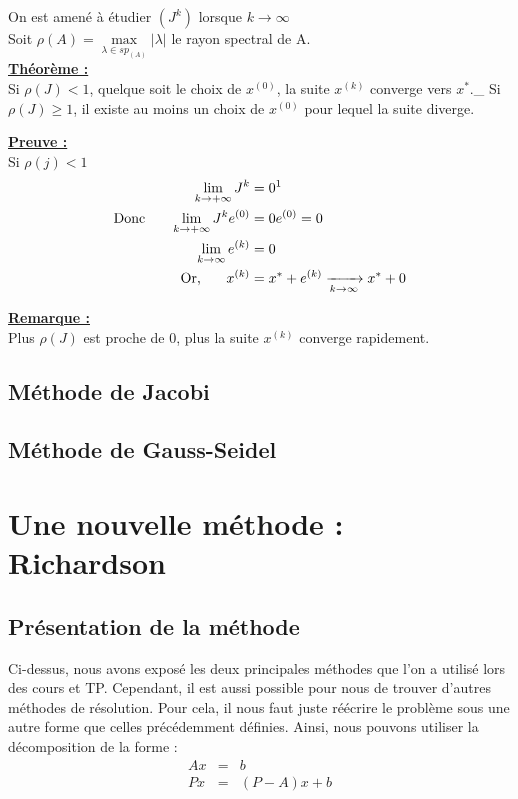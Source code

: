 On est amené à étudier $\left(J^k\right)$ lorsque $k \to \infty$\\

Soit $\rho(A) = \underset{\lambda \in sp_{(A)}}{\max}\left|\lambda\right|$ le rayon spectral de A.\\
\noindent\textbf{\underline{Théorème :}}\\
Si $\rho(J) < 1$, quelque soit le choix de $x^{(0)}$, la suite $x^{(k)}$ converge vers $x^*$.\_
Si $\rho(J) \geq 1$, il existe au moins un choix de $x^{(0)}$ pour lequel la suite diverge.

\noindent\textbf{\underline{Preuve :}}\\
Si $\rho(j) < 1$ \\
\begin{align*}
\lim\limits_{k \to +\infty} J^k &= 0 \text{\footnotemark}\\
\text{Donc } \hspace{15pt} \lim\limits_{k \to +\infty} J^ke^{(0)} &= 0e^{(0)} = 0\\
\lim\limits_{k \to \infty} e^{(k)} &= 0\\
\text{Or, } \hspace{15pt} x^{(k)} &= x^* + e^{(k)} \xrightarrow[k\to \infty]{}x^* + 0 
\end{align*}

\noindent\textbf{\underline{Remarque :}}\\
Plus $\rho(J)$ est proche de 0, plus la suite $x^{(k)}$ converge rapidement.


\subsection{Méthode de Jacobi}






\subsection{Méthode de Gauss-Seidel}
\section{Une nouvelle méthode : Richardson}
\subsection{Présentation de la méthode}
Ci-dessus, nous avons exposé les deux principales méthodes que l'on a utilisé lors des cours et TP. Cependant, il est aussi possible pour nous de trouver d'autres méthodes de résolution. Pour cela, il nous faut juste réécrire le problème sous une autre forme que celles précédemment définies. Ainsi, nous pouvons utiliser la décomposition de la forme :  
\begin{eqnarray}
Ax &=& b\\
Px &=& (P - A)x + b
\end{eqnarray}


